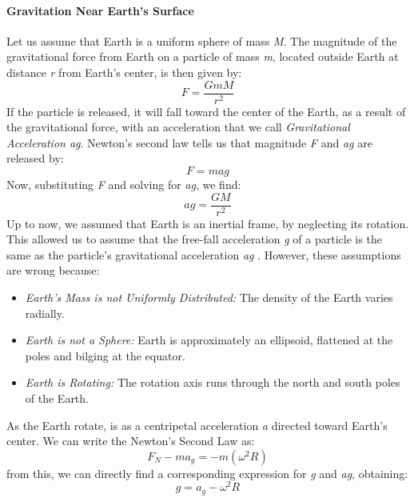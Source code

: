 \documentclass{scrartcl}
\begin{document}
	\paragraph{Gravitation Near Earth's Surface} Let us assume that Earth is a uniform sphere of mass {\em M}. The magnitude of the gravitational force from Earth on a particle of mass {\em m}, located outside Earth at distance {\em 			r} from Earth's center, is then given by: 
			\begin{equation}
			{F} =  \frac{GmM}{r^2} 
			\end{equation}
			If the particle is released, it will fall toward the center of the Earth, as a result of the gravitational force, with an acceleration that we call {\em Gravitational Acceleration ag}. Newton's second law tells us that magnitude {\em 			F} and {\em ag} are released by:
			\begin{equation}
			{F} =  {mag}
			\end{equation}
			Now, substituting {\em F} and solving for {\em ag}, we find:
			\begin{equation}
			{ag} =  \frac{GM}{r^2} 
			\end{equation}
			Up to now, we assumed that Earth is an inertial frame, by neglecting its rotation. This allowed us to assume that the free-fall acceleration {\em g} of a particle is the same as the particle's gravitational acceleration {\em ag}
			. However, these assumptions are wrong because:
			\begin{itemize}
 			 \item {\em Earth's Mass is not Uniformly Distributed: } The density of the Earth varies radially.
 			\item {\em Earth is not a Sphere: } Earth is approximately an ellipsoid, flattened at the poles and bilging at the equator.
			\item {\em Earth is Rotating: } The rotation axis runs through the north and south poles of the Earth.
			\end{itemize}
			As the Earth rotate, is as a centripetal acceleration {\em a} directed toward Earth's center. We can write the Newton's Second Law as:
			\begin{equation}
			{F_N - ma_g} =  -m(\omega^2 R)
			\end{equation}
			from this, we can directly find a corresponding expression for {\em g} and {\em ag}, obtaining:
			\begin{equation}
			{g} =  {}a_g - \omega^2 R
			\end{equation}
			
\end{document}
